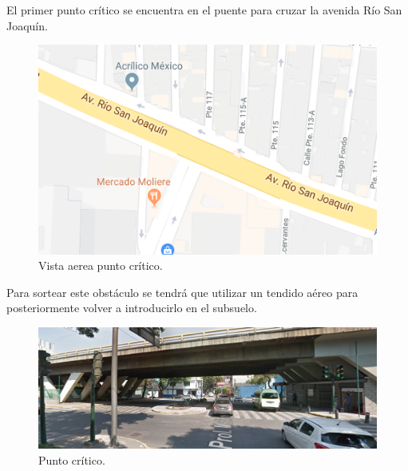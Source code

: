 \documentclass[12pt,letterpaper]{article}
\begin{document}
El primer punto crítico se encuentra en el puente para cruzar la 
avenida Río San Joaquín.
\begin{figure}[ht]
    \centering
    \includegraphics[width=.6\textwidth]{f4.png}
    \caption{Vista aerea punto crítico.}
\end{figure}

Para sortear este obstáculo se tendrá que utilizar un tendido aéreo 
para posteriormente volver a introducirlo en el subsuelo.
\begin{figure}[ht]
    \centering
    \includegraphics[width=1\textwidth]{f6.png}
    \caption{Punto crítico.}
\end{figure}
\end{document}
